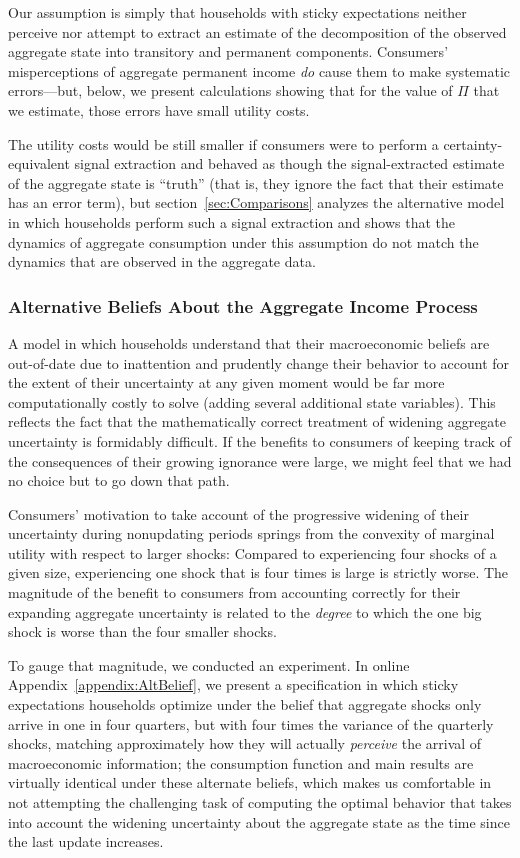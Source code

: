 \documentclass[titlepage]{./econtex}
\begin{document}
Our assumption is simply that households with sticky expectations neither perceive nor attempt to extract an estimate of the decomposition of the observed aggregate state into transitory and permanent components.  Consumers' misperceptions of aggregate permanent income \textit{do} cause them to make systematic errors---but, below, we present calculations showing that for the value of $\Pi$ that we estimate, those errors have small utility costs.

The utility costs would be still smaller if consumers were to perform a certainty-equivalent signal extraction and behaved as though the signal-extracted estimate of the aggregate state is ``truth'' (that is, they ignore the fact that their estimate has an error term), but section~\ref{sec:Comparisons} analyzes the alternative model in which households perform such a signal extraction and shows that the dynamics of aggregate consumption under this assumption do not match the dynamics that are observed in the aggregate data.

\subsubsection{Alternative Beliefs About the Aggregate Income Process}
A model in which households understand that their macroeconomic beliefs are out-of-date due to inattention and prudently change their behavior to account for the extent of their uncertainty at any given moment would be far more computationally costly to solve (adding several additional state variables).  This reflects the fact that the mathematically correct treatment of widening aggregate uncertainty is formidably difficult.  If the benefits to consumers of keeping track of the consequences of their growing ignorance were large, we might feel that we had no choice but to go down that path.

Consumers' motivation to take account of the progressive widening of their uncertainty during nonupdating periods springs from the convexity of marginal utility with respect to larger shocks: Compared to experiencing four shocks of a given size, experiencing one shock that is four times is large is strictly worse.  The magnitude of the benefit to consumers from accounting correctly for their expanding aggregate uncertainty is related to the \textit{degree} to which the one big shock is worse than the four smaller shocks.

To gauge that magnitude, we conducted an experiment.  In online Appendix~\ref{appendix:AltBelief}, we present a specification in which sticky expectations households optimize under the belief that aggregate shocks only arrive in one in four quarters, but with four times the variance of the quarterly shocks, matching approximately how they will actually \textit{perceive} the arrival of macroeconomic information; the consumption function and main results are virtually identical under these alternate beliefs, which makes us comfortable in not attempting the challenging task of computing the optimal behavior that takes into account the widening uncertainty about the aggregate state as the time since the last update increases.
\end{document}
